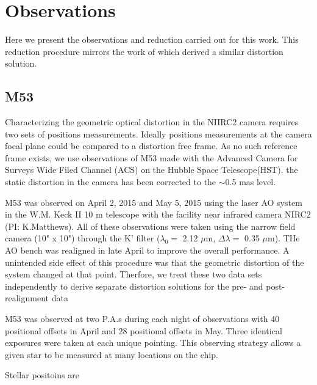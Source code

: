 \section{Observations}
Here we present the observations and reduction carried out for this work.  This reduction procedure mirrors the work of \cite{Yelda_2010} which derived a similar distortion solution.  
\subsection{M53}
Characterizing the geometric optical distortion in the NIIRC2 camera requires two sets of positions measurements.  Ideally positions measurements at the camera focal plane could be compared to a distortion free frame.  As no such reference frame exists, we use observations of M53 made with the Advanced Camera for Surveys Wide Filed Channel (ACS) on the Hubble Space Telescope(HST).  the static distortion in the camera has been corrected to the $\sim$0.5 mas level.

M53 was observed on April 2, 2015 and May 5, 2015 using the laser AO system in the W.M. Keck II 10 m telescope with the facility near infrared camera NIRC2 (PI: K.Matthews).  All of these observations were taken using the narrow field camera (10" x 10") through the K' filter ($\lambda_{0} = $ 2.12 $\mu$m, $\Delta\lambda =$ 0.35 $\mu$m).  THe AO bench was realigned  in late April to improve the overall performance.  A unintended side effect of this procedure was that the geometric distortion of the system changed at that point.  Therfore, we treat these two data sets independently to derive separate distortion solutions for the pre- and post- realignment data 

M53 was observed at two P.A.s during each night of observations with 40 positional offsets in April and 28 positional offsets in May.  Three identical exposures were taken at each unique pointing.  This observing strategy allows a given star to be measured at many locations on the chip.

Stellar positoins are 




